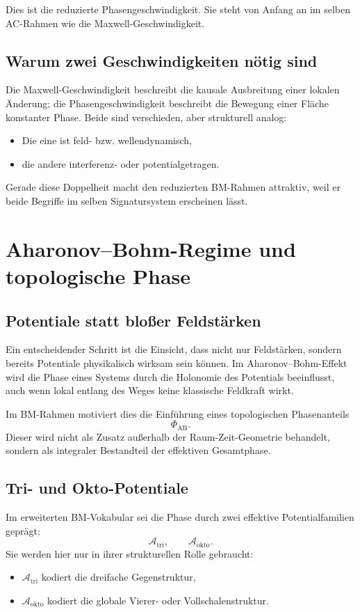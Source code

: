 \documentclass[11pt,a4paper]{article}
\theoremstyle{definition}
\theoremstyle{plain}
\begin{document}
	Dies ist die reduzierte Phasengeschwindigkeit. Sie steht von Anfang an im selben AC-Rahmen wie die Maxwell-Geschwindigkeit.
	
	\subsection{Warum zwei Geschwindigkeiten nötig sind}
	
	Die Maxwell-Geschwindigkeit beschreibt die kausale Ausbreitung einer lokalen Änderung; die Phasengeschwindigkeit beschreibt die Bewegung einer Fläche konstanter Phase. Beide sind verschieden, aber strukturell analog:
	\begin{itemize}[leftmargin=2em]
		\item Die eine ist feld- bzw. wellendynamisch,
		\item die andere interferenz- oder potentialgetragen.
	\end{itemize}
	
	Gerade diese Doppelheit macht den reduzierten BM-Rahmen attraktiv, weil er beide Begriffe im selben Signatursystem erscheinen lässt.
	
	\section{Aharonov--Bohm-Regime und topologische Phase}
	
	\subsection{Potentiale statt bloßer Feldstärken}
	
	Ein entscheidender Schritt ist die Einsicht, dass nicht nur Feldstärken, sondern bereits Potentiale physikalisch wirksam sein können. Im Aharonov--Bohm-Effekt wird die Phase eines Systems durch die Holonomie des Potentials beeinflusst, auch wenn lokal entlang des Weges keine klassische Feldkraft wirkt.
	
	Im BM-Rahmen motiviert dies die Einführung eines topologischen Phasenanteils
	\[
	\Phi_{\mathrm{AB}}.
	\]
	Dieser wird nicht als Zusatz außerhalb der Raum-Zeit-Geometrie behandelt, sondern als integraler Bestandteil der effektiven Gesamtphase.
	
	\subsection{Tri- und Okto-Potentiale}
	
	Im erweiterten BM-Vokabular sei die Phase durch zwei effektive Potentialfamilien geprägt:
	\[
	\mathcal A_{\mathrm{tri}},
	\qquad
	\mathcal A_{\mathrm{okto}}.
	\]
	Sie werden hier nur in ihrer strukturellen Rolle gebraucht:
	\begin{itemize}[leftmargin=2em]
		\item $\mathcal A_{\mathrm{tri}}$ kodiert die dreifache Gegenstruktur,
		\item $\mathcal A_{\mathrm{okto}}$ kodiert die globale Vierer- oder Vollschalenstruktur.
	\end{itemize}
	
\end{document}
